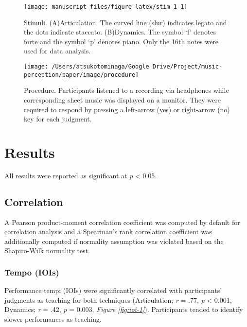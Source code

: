 \documentclass[
  man,floatsintext]{apa6}
\begin{document}
\begin{figure}
\texttt{[image: manuscript\_files/figure-latex/stim-1-1]} \caption{\label{fig:stim1}Stimuli. (A)Articulation. The curved line (slur) indicates legato and the dots indicate staccato. (B)Dynamics. The symbol `f' denotes forte and the symbol `p' denotes piano. Only the 16th notes were used for data analysis.}\label{fig:stim-1}
\end{figure}

\begin{figure}
\texttt{[image: /Users/atsukotominaga/Google Drive/Project/music-perception/paper/image/procedure]} \caption{\label{fig:procedure1}Procedure. Participants listened to a recording via headphones while corresponding sheet music was displayed on a monitor. They were required to respond by pressing a left-arrow (yes) or right-arrow (no) key for each judgment.}\label{fig:procedure-1}
\end{figure}

\clearpage

\hypertarget{results}{%
\section{Results}\label{results}}

All results were reported as significant at \emph{p} \textless{} 0.05.

\hypertarget{correlation}{%
\subsection{Correlation}\label{correlation}}

A Pearson product-moment correlation coefficient was computed by default for correlation analysis and a Spearman's rank correlation coefficient was additionally computed if normality assumption was violated based on the Shapiro-Wilk normality test.

\hypertarget{tempo-iois}{%
\subsubsection{Tempo (IOIs)}\label{tempo-iois}}

Performance tempi (IOIs) were significantly correlated with participants' judgments as teaching for both techniques (Articulation; \emph{r} = .77, \emph{p} \textless{} 0.001, Dynamics; \emph{r} = .42, \emph{p} = 0.003, \emph{Figure \ref{fig:ioi-1}}). Participants tended to identify slower performances as teaching.
\end{document}

